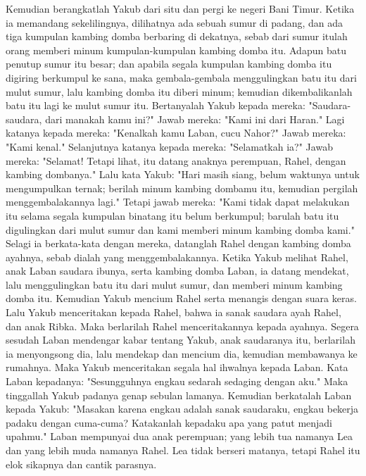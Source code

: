 \begin{biblechapter} %
\verse Kemudian berangkatlah Yakub dari situ dan pergi ke negeri Bani Timur.
\verse Ketika ia memandang sekelilingnya, dilihatnya ada sebuah sumur di padang, dan ada tiga kumpulan kambing domba berbaring di dekatnya, sebab dari sumur itulah orang memberi minum kumpulan-kumpulan kambing domba itu. Adapun batu penutup sumur itu besar;
\verse dan apabila segala kumpulan kambing domba itu digiring berkumpul ke sana, maka gembala-gembala menggulingkan batu itu dari mulut sumur, lalu kambing domba itu diberi minum; kemudian dikembalikanlah batu itu lagi ke mulut sumur itu.
\verse Bertanyalah Yakub kepada mereka: "Saudara-saudara, dari manakah kamu ini?" Jawab mereka: "Kami ini dari Haran."
\verse Lagi katanya kepada mereka: "Kenalkah kamu Laban, cucu Nahor?" Jawab mereka: "Kami kenal."
\verse Selanjutnya katanya kepada mereka: "Selamatkah ia?" Jawab mereka: "Selamat! Tetapi lihat, itu datang anaknya perempuan, Rahel, dengan kambing dombanya."
\verse Lalu kata Yakub: "Hari masih siang, belum waktunya untuk mengumpulkan ternak; berilah minum kambing dombamu itu, kemudian pergilah menggembalakannya lagi."
\verse Tetapi jawab mereka: "Kami tidak dapat melakukan itu selama segala kumpulan binatang itu belum berkumpul; barulah batu itu digulingkan dari mulut sumur dan kami memberi minum kambing domba kami."
\verse Selagi ia berkata-kata dengan mereka, datanglah Rahel dengan kambing domba ayahnya, sebab dialah yang menggembalakannya.
\verse Ketika Yakub melihat Rahel, anak Laban saudara ibunya, serta kambing domba Laban, ia datang mendekat, lalu menggulingkan batu itu dari mulut sumur, dan memberi minum kambing domba itu.
\verse Kemudian Yakub mencium Rahel serta menangis dengan suara keras.
\verse Lalu Yakub menceritakan kepada Rahel, bahwa ia sanak saudara ayah Rahel, dan anak Ribka. Maka berlarilah Rahel menceritakannya kepada ayahnya.
\verse Segera sesudah Laban mendengar kabar tentang Yakub, anak saudaranya itu, berlarilah ia menyongsong dia, lalu mendekap dan mencium dia, kemudian membawanya ke rumahnya. Maka Yakub menceritakan segala hal ihwalnya kepada Laban.
\verse Kata Laban kepadanya: "Sesungguhnya engkau sedarah sedaging dengan aku." Maka tinggallah Yakub padanya genap sebulan lamanya.
\verse Kemudian berkatalah Laban kepada Yakub: "Masakan karena engkau adalah sanak saudaraku, engkau bekerja padaku dengan cuma-cuma? Katakanlah kepadaku apa yang patut menjadi upahmu."
\verse Laban mempunyai dua anak perempuan; yang lebih tua namanya Lea dan yang lebih muda namanya Rahel.
\verse Lea tidak berseri matanya, tetapi Rahel itu elok sikapnya dan cantik parasnya.

\end{biblechapter}

